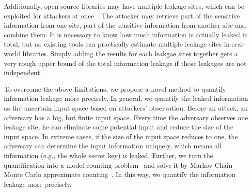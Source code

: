 Additionally, open source libraries may have multiple leakage sites, which can be exploited for attackers
at once~\cite{191010,7163052,hornby2011side}. 
The attacker may retrieve part of the sensitive information from one site, part of the sensitive
information from another site and combine them.
It is necessary to know how much information is actually leaked in total, 
but no existing tools can practically estimate multiple leakage sites in real-world libraries.
Simply adding the results for each leakgae sites together gets a very rough upper bound of 
the total information leakage if those 
leakages are not independent. 

To overcome the above limitations, we propose a novel method
to quantify information leakage more precisely. 
In general, we quantify the leaked information as the uncertain input space based on attackers' observation.
Before an attack, an adversary has a big, but finite input space.
Every time the adversary observes one leakage site, he can eliminate some potential input and
reduce the size of the input space. 
In extreme cases, if the size of the input space reduces to one, 
the adversary can determine the input information uniquely, which means all information
(e.g., the whole secret key) is leaked. 
Further, we turn the quantification into a model counting problem~\cite{bibid} 
and solve it by Markov Chain Monte Carlo approximate counting~\cite{bibid}. 
In this way, we quantify the information leakage more precisely.


